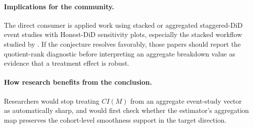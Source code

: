 \documentclass[11pt]{article}
\theoremstyle{definition}
\theoremstyle{plain}
\theoremstyle{remark}
\begin{document}
\paragraph{Implications for the community.}
The direct consumer is applied work using stacked or aggregated staggered-DiD event studies with Honest-DiD sensitivity plots, especially the stacked workflow studied by \citet{wing2024stacked}.
If the conjecture resolves favorably, those papers should report the quotient-rank diagnostic before interpreting an aggregate breakdown value as evidence that a treatment effect is robust.

\paragraph{How research benefits from the conclusion.}
Researchers would stop treating \(CI(M)\) from an aggregate event-study vector as automatically sharp, and would first check whether the estimator's aggregation map preserves the cohort-level smoothness support in the target direction.
\end{document}
